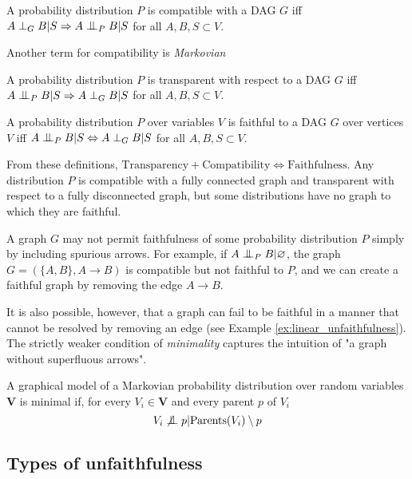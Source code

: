 \begin{definition}[Compatibility]\label{def:compatibility}
A probability distribution $P$ is compatible with a DAG $G$ iff $A\perp_G B |S \Rightarrow A\CI_P B | S$ for all $A, B, S \subset V$.

Another term for compatibility is \emph{Markovian}
\end{definition}

\begin{definition}[Transparency]
A probability distribution $P$ is transparent with respect to a DAG $G$ iff $A\CI_P B|S \Rightarrow A\perp_G B|S$ for all $A,B,S\subset V$.
\end{definition}

\begin{definition}[Faithfulness]\label{def:faithfulness}
A probability distribution $P$ over variables $V$ is faithful to a DAG $G$ over vertices $V$ iff $A \CI_P B | S \Leftrightarrow A\perp_G B | S$ for all $A,B,S\subset V$.
\end{definition}

From these definitions, $\text{Transparency}+\text{Compatibility}\Leftrightarrow \text{Faithfulness}$. Any distribution $P$ is compatible with a fully connected graph and transparent with respect to a fully disconnected graph, but some distributions have no graph to which they are faithful.

A graph $G$ may not permit faithfulness of some probability distribution $P$ simply by including spurious arrows. For example, if $A\CI_P B | \varnothing$, the graph $G=(\{A,B\},A\to B)$ is compatible but not faithful to $P$, and we can create a faithful graph by removing the edge $A\to B$.

It is also possible, however, that a graph can fail to be faithful in a manner that cannot be resolved by removing an edge (see Example \ref{ex:linear_unfaithfulness}). The strictly weaker condition of \emph{minimality} captures the intuition of "a graph without superfluous arrows".

\begin{definition}[Minimality]\label{def:minimality}
A graphical model of a Markovian probability distribution over random variables $\mathbf{V}$ is minimal if, for every $V_i\in\mathbf{V}$ and every parent $p$ of $V_i$
\[V_i\not\CI p|\mathrm{Parents}(V_i)\setminus p\]
\end{definition}

\subsection{Types of unfaithfulness}

